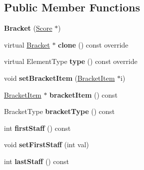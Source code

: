 \subsection*{Public Member Functions}
\begin{DoxyCompactItemize}
\item 
\mbox{\label{class_ms_1_1_bracket_aef2e2d7dddb4e6a528853a1d536af6a5}} 
{\bfseries Bracket} (\hyperlink{class_ms_1_1_score}{Score} $\ast$)
\item 
\mbox{\label{class_ms_1_1_bracket_aaa403e36bf442317f0e3223e44b3431f}} 
virtual \hyperlink{class_ms_1_1_bracket}{Bracket} $\ast$ {\bfseries clone} () const override
\item 
\mbox{\label{class_ms_1_1_bracket_a0473770d2b6834d36a53c80914e0df34}} 
virtual Element\+Type {\bfseries type} () const override
\item 
\mbox{\label{class_ms_1_1_bracket_a25bbffc5c8a02dbbfc1144639227972e}} 
void {\bfseries set\+Bracket\+Item} (\hyperlink{class_ms_1_1_bracket_item}{Bracket\+Item} $\ast$i)
\item 
\mbox{\label{class_ms_1_1_bracket_a5177f24e66f71c0c8706de5c89e0e4e7}} 
\hyperlink{class_ms_1_1_bracket_item}{Bracket\+Item} $\ast$ {\bfseries bracket\+Item} () const
\item 
\mbox{\label{class_ms_1_1_bracket_ada6bf2e525228c0bd011d98c9c36af2f}} 
Bracket\+Type {\bfseries bracket\+Type} () const
\item 
\mbox{\label{class_ms_1_1_bracket_a51b58d030fecfda569e7f4268e6297cf}} 
int {\bfseries first\+Staff} () const
\item 
\mbox{\label{class_ms_1_1_bracket_ac07a7c2d78c0fb36fe2620f69afd9452}} 
void {\bfseries set\+First\+Staff} (int val)
\item 
\mbox{\label{class_ms_1_1_bracket_a81e565adcfe99030cdab210807d63eee}} 
int {\bfseries last\+Staff} () const
\item 
\mbox{\label{class_ms_1_1_bracket_ab515efcef6dbb2da24b0875862f0404b}} 

\end{DoxyCompactItemize}
